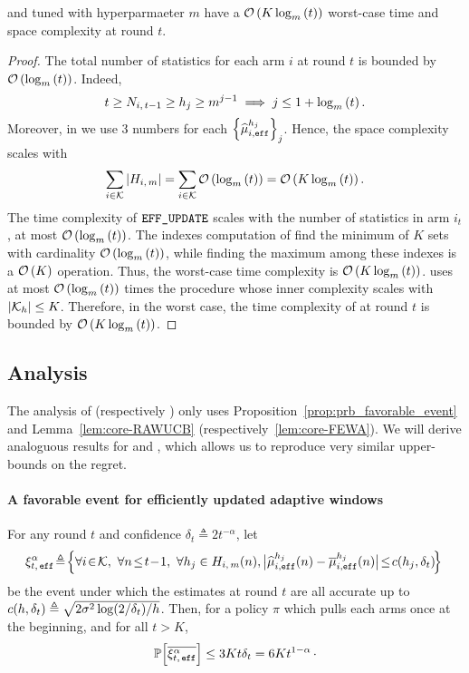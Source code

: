 \begin{proposition}
\EFFFEWA and \EFFRAW tuned with hyperparmaeter $m$ have a $\mathcal{O}\left(K\log_m\left(t\right)\right)$ worst-case time and space complexity at round $t$.
\end{proposition}
\begin{proof}
The total number of statistics for each arm $i$ at round $t$ is bounded by $\mathcal{O}\left(\log_m\left(t\right)\right)$. Indeed, 
\[t \geq N_{i,\,t-1} \geq h_j \geq m^{j-1} \implies j \leq 1 + \log_m\left(t\right).\]
Moreover, in \EFF we use 3 numbers for each $\left\{\widehat{\mu}_{i,\texttt{eff}}^{h_j}\right\}_j$. Hence, the space complexity scales with \[ \sum_{i\in \mathcal{K}} | H_{i,\,m}| = \sum_{i\in \mathcal{K}} \mathcal{O}\left(\log_m\left(t\right)\right) = \mathcal{O}\left(K\log_m\left(t\right)\right).\]
The time complexity of $\normalfont {\texttt{EFF\_UPDATE}}$ scales with the number of statistics in arm $i_t$, \ie at most $\mathcal{O}\left(\log_m\left(t\right)\right)$. The indexes computation of \EFFRAW  find the minimum of $K$ sets with cardinality $\mathcal{O}\left(\log_m\left(t\right)\right)$, while finding the maximum among these indexes is a $\mathcal{O}\left(K\right)$ operation.  Thus, the worst-case time complexity is $\mathcal{O}\left(K\log_m\left(t\right)\right)$. \EFFFEWA uses at most $\mathcal{O}\left(\log_m\left(t\right)\right)$ times the procedure \FILTER  whose inner complexity scales with $|\mathcal{K}_h| \leq K$. Therefore, in the worst case, the time complexity of \EFFFEWA at round $t$ is bounded by $\mathcal{O}\left(K\log_m\left(t\right)\right)$.
\end{proof}



\subsection{Analysis}


The analysis of \RUCB (respectively \FEWA) only uses Proposition~\ref{prop:prb_favorable_event} and Lemma~\ref{lem:core-RAWUCB} (respectively~\ref{lem:core-FEWA}). We will derive analoguous results for \EFFRAW and \EFFFEWA, which allows us to reproduce very similar upper-bounds on the regret. 
\paragraph{A favorable event for efficiently updated adaptive windows}
\begin{proposition}
\label{prop:prb_favorable_event_eff}
For any round $t$ and confidence $\delta_{t} \triangleq 2t^{-\alpha}$, let 
%
\begin{equation*}
\!\HPeff\! \triangleq\! \Big\{ \forall i\!\in\!\arms,\ \forall n \!\leq\! t\!-\!1 ,\ \forall h_j \in \Him(n), \big| \hmueff(n) - \bmueff(n) \big| \!\leq\! c(h_j, \delta_{t}) \!\Big\}
\end{equation*}
 be the event under which the estimates at round $t$  are all accurate up to $c(h,\delta_{t}) \triangleq \sqrt{2 \sigma^2\log(2/\delta_t)/h}$. Then, for a policy $\pi$ which pulls each arms once at the beginning, and for all $t>K$,
\[
\mathbb{P}\Big[\overline{\xi^\alpha_{t,\, \texttt{eff}}}\Big] \leq 3Kt\delta_t= 6Kt^{1-\alpha}\,\cdot
\]
\end{proposition} 

